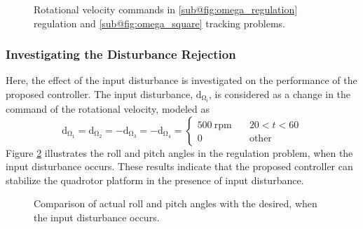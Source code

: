 \documentclass[peerreview]{IEEEtran}
\begin{document}
\begin{figure}[H]
	\caption{Rotational velocity  commands in \ref{sub@fig:omega_regulation} regulation and \ref{sub@fig:omega_square} tracking problems.}
	\label{fig:omega}
\end{figure}
\subsubsection{Investigating the Disturbance Rejection}\label{sec:disturbance}
\noindent Here, the effect of the input disturbance is investigated on the performance of the proposed controller.
The input disturbance, $\mathrm{d_{\Omega_i}}$, is considered as a change in the command of the rotational velocity, modeled as %
\begin{equation}
	\mathrm{d_{\Omega_1}} = \mathrm{d_{\Omega_2}} = -\mathrm{d_{\Omega_3}} = -\mathrm{d_{\Omega_4}} = \begin{cases}
		500~{\mathrm{rpm}} \quad &20<t<60\\
		0 \quad &\mathrm{other}
	\end{cases}
\end{equation}
Figure \ref{fig:disturbance} illustrates the roll and pitch angles in the regulation problem, when the input disturbance occurs. These results indicate that the proposed controller can stabilize the quadrotor platform in the presence of input disturbance.



\begin{figure}[H]
	\centering
	
	\caption{Comparison of actual roll and pitch angles with the desired, when the input disturbance occurs.}
	\label{fig:disturbance}
\end{figure}
\end{document}
